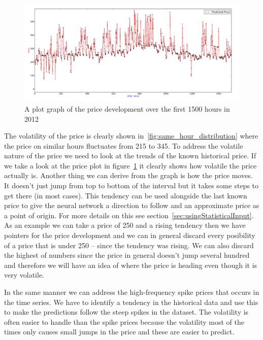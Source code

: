 \begin{figure}[H]
\centering
\includegraphics[width=\textwidth ,natwidth=410,natheight=237]{billeder/energy_price_plots/plotGraph.jpg}
\caption{A plot graph of the price development over the first 1500 hours in 2012}
\label{fig:plotGraph}
\end{figure}

The volatility of the price is clearly shown in~\ref{fig:same_hour_distribution} where the price on similar hours fluctuates from 215 to 345. To address the volatile nature of the price we need to look at the trends of the known historical price. If we take a look at the price plot in figure~\ref{fig:plotGraph} it clearly shows how volatile the price actually is. Another thing we can derive from the graph is how the price moves. It doesn't just jump from top to bottom of the interval but it takes some steps to get there (in most cases). This tendency can be used alongside the last known price to give the neural network a direction to follow and an approximate price as a point of origin. For more details on this see section~\ref{sec:usingStatisticalInput}. As an example we can take a price of 250 and a rising tendency then we have pointers for the price development and we can in general discard every posibility of a price that is under 250 -- since the tendency was rising. We can also discard the highest of numbers since the price in general doesn't jump several hundred and therefore we will have an idea of where the price is heading even though it is very volatile.

In the same manner we can address the high-frequency spike prices that occurs in the time series. We have to identify a tendency in the historical data and use this to make the predictions follow the steep spikes in the dataset. The volatility is often easier to handle than the spike prices because the volatility most of the times only causes small jumps in the price and these are easier to predict.


